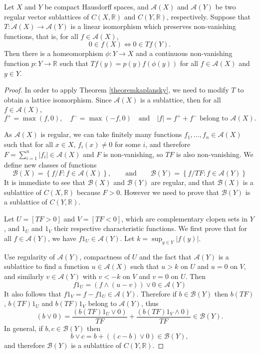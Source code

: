 \begin{theorem}\label{theoremliwong}
Let $X$ and $Y$ be compact Hausdorff spaces, and $\mathcal{A}(X)$ and $\mathcal{A}(Y)$ be two regular vector sublattices of $C(X,\mathbb{R})$ and $C(Y,\mathbb{R})$, respectively. Suppose that $T:\mathcal{A}(X)\to \mathcal{A}(Y)$ is a linear isomorphism which preserves non-vanishing functions, that is, for all $f\in\mathcal{A}(X)$,
\[0\in f(X)\iff 0\in Tf(Y).\]
Then there is a homeomorphism $\phi:Y\to X$ and a continuous non-vanishing function $p:Y\to\mathbb{R}$ such that $Tf(y)=p(y)f(\phi(y))$ for all $f\in\mathcal{A}(X)$ and $y\in Y$.
\end{theorem}
\begin{proof}
In order to apply Theorem \ref{theoremkaplansky}, we need to modify $T$ to obtain a lattice isomorphism. Since $\mathcal{A}(X)$ is a sublattice, then for all $f\in\mathcal{A}(X)$,
\[f^+=\max(f,0),\quad f^-=\max(-f,0)\quad\text{and}\quad|f|=f^++f^-\text{ belong to }\mathcal{A}(X).\]

As $\mathcal{A}(X)$ is regular, we can take finitely many functions $f_1,\ldots,f_n\in\mathcal{A}(X)$ such that for all $x\in X$, $f_i(x)\neq 0$ for some $i$, and therefore $F=\sum_{i=1}^n|f_i|\in\mathcal{A}(X)$ and $F$ is non-vanishing, so $TF$ is also non-vanishing. We define new classes of functions
\[\mathcal{B}(X)=\left\{f/F:f\in\mathcal{A}(X)\right\},\qquad\text{and}\qquad\mathcal{B}(Y)=\left\{f/TF:f\in\mathcal{A}(Y)\right\}\]
It is immediate to see that $\mathcal{B}(X)$ and $\mathcal{B}(Y)$ are regular, and that $\mathcal{B}(X)$ is a sublattice of $C(X,\mathbb{R})$ because $F>0$. However we need to prove that $\mathcal{B}(Y)$ is a sublattice of $C(Y,\mathbb{R})$.

Let $U=[TF>0]$ and $V=[TF<0]$, which are complementary clopen sets in $Y$, and $1_U$ and $1_V$ their respective characteristic functions. We first prove that for all $f\in\mathcal{A}(Y)$, we have $f1_U\in\mathcal{A}(Y)$. Let $k=\sup_{y\in Y}|f(y)|$.

Use regularity of $\mathcal{A}(Y)$, compactness of $U$ and the fact that $\mathcal{A}(Y)$ is a sublattice to find a function $u\in\mathcal{A}(X)$ such that $u>k$ on $U$ and $u=0$ on $V$, and similarly $v\in\mathcal{A}(Y)$ with $v<-k$ on $V$ and $v=0$ on $U$. Then
\[f1_U=(f\land (u-v))\lor 0\in\mathcal{A}(Y)\]
It also follows that $f1_V=f-f1_U\in\mathcal{A}(Y)$. Therefore if $b\in\mathcal{B}(Y)$ then $b(TF)$, $b(TF)1_U$ and $b(TF)1_V$ belong to $\mathcal{A}(Y)$, thus
\[(b\lor 0)=\frac{(b(TF)1_U\lor 0)}{TF}+\frac{(b(TF)1_V\land 0)}{TF}\in\mathcal{B}(Y).\]
In general, if $b,c\in\mathcal{B}(Y)$ then
\[b\lor c=b+((c-b)\lor 0)\in\mathcal{B}(Y),\]
and therefore $\mathcal{B}(Y)$ is a sublattice of $C(Y,\mathbb{R})$.


\end{proof}
